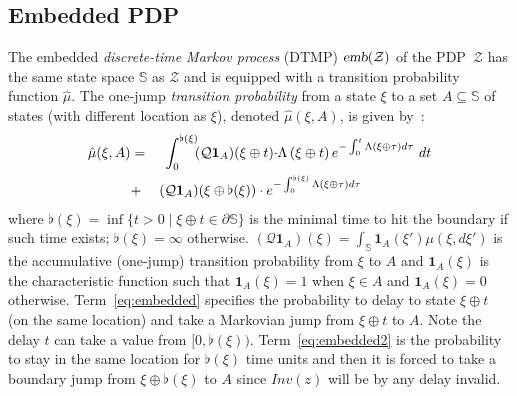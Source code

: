 \documentclass{LMCS}
\newcommand{\mc}[1]{\mathcal{#1}}
\newcommand{\mb}{\mathbb}
\newcommand{\<}{\langle}
\renewcommand{\>}{\rangle}
\newcommand{\DTMP}{\textsc{DTMP}}
\newcommand{\PDP}{\textsc{PDP}}
\newcommand{\emb}{\textsl{emb}}
\newcommand{\Inv}{\mathit{Inv}}
\begin{document}
\subsection{Embedded PDP}
The embedded  \emph{discrete-time Markov process} (\DTMP) $\emb(\mc{Z})$
of the \PDP\ $\mc{Z}$ has the same state space $\mb{S}$ as $\mc{Z}$ and is
equipped with a transition probability function $\hat{\mu}$.
The one-jump \emph{transition probability} from a state $\xi$ to a set $A
\subseteq \mb{S}$ of states (with different location as $\xi$), denoted
$\hat\mu(\xi, A)$, is given by~\cite{Dav93}:
\begin{eqnarray}
\hat\mu(\xi,A)&=&\int_0^{{\flat}(\xi)}\hspace{-0.1cm}(\mc{Q}\mathbf{1}_{A})(\xi\oplus
t){\cdot}\Lambda\left(\xi\oplus t\right)
e^{-\int_0^t\Lambda\left(\xi\oplus \tau\right)d\tau}\ dt \label{eq:embedded}\\
&+&(\mc{Q}\mathbf{1}_{A})(\xi\oplus\flat(\xi))\cdot
e^{-\int_0^{\flat(\xi)}\Lambda\left(\xi\oplus\tau\right)d\tau} \qquad\qquad\quad
\label{eq:embedded2}
\end{eqnarray}
where $\flat(\xi) = \inf\{{t>0}\!\mid\!{\xi \oplus t \in \partial\mb{S}}\}$ is the
minimal time to hit the boundary if such time exists; $\flat(\xi)= \infty$ otherwise.
$(\mc{Q}\mathbf{1}_{A})(\xi)=\int_{\mb{S}}\mathbf{1}_{A}(\xi')\mu(\xi,d\xi')$
is the accumulative (one-jump) transition probabi\-li\-ty from $\xi$ to $A$ and
$\mathbf{1}_{A}(\xi)$ is the characteristic function such that $\mathbf{1}_{A}(\xi)
= 1$ when $\xi \in A$ and $\mathbf{1}_{A}(\xi) = 0$ otherwise.
Term~\eqref{eq:embedded} specifies the probability to delay to state ${\xi\oplus t}$
(on the same location) and take a Markovian jump from ${\xi\oplus t}$ to $A$.
Note the delay $t$ can take a value from $[0,\flat(\xi))$.
Term~\eqref{eq:embedded2} is the probability to stay in the same location for
$\flat(\xi)$ time units and then it is forced to take a boundary jump from $\xi \oplus
\flat(\xi)$ to $A$ since $\Inv(z)$ will be by any delay invalid.
\end{document}
